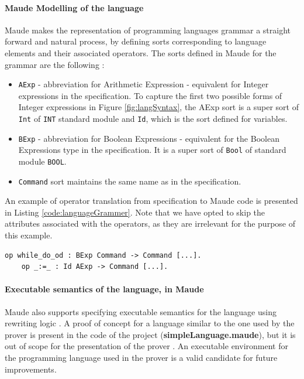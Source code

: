 \documentclass[12pt,a4paper]{article}
\begin{document}
{	\paragraph{Maude Modelling of the language}
	Maude makes the representation of programming languages grammar a straight forward and natural process, by defining sorts corresponding to language elements and their associated operators. The sorts defined in Maude for the grammar are the following : 
	\begin{itemize}
		\item \texttt{AExp} - abbreviation for Arithmetic Expression - equivalent for Integer expressions in the specification. To capture the first two possible forms of Integer expressions in Figure \ref{fig:langSyntax}, the AExp sort is a super sort of \texttt{Int} of \texttt{INT} standard module and \texttt{Id}, which is the sort defined for variables.
		\item \texttt{BExp} - abbreviation for Boolean Expressions - equivalent for the Boolean Expressions type in the specification. It is a super sort of \texttt{Bool} of standard module \texttt{BOOL}. 
		\item \texttt{Command} sort maintains the same name as in the specification.
	\end{itemize}
	An example of operator translation from specification to Maude code is presented in Listing \ref{code:languageGrammer}. Note that we have opted to skip the attributes associated with the operators, as they are irrelevant for the purpose of this example.
	\\
	
	\begin{lstlisting}[label=code:languageGrammer,caption=Example of operator translation to Maude code]
	op while_do_od : BExp Command -> Command [...].
	op _:=_ : Id AExp -> Command [...]. 
	\end{lstlisting}
	
	\paragraph{Executable semantics of the language, in Maude}
	Maude also supports specifying executable semantics for the language using rewriting logic \cite{rewrConcurrency}. A proof of concept for a language similar to the one used by the prover is present in the code of the project (\textbf{simpleLanguage.maude}), but it is out of scope for the presentation of the prover . An executable environment for the programming language used in the prover is a valid candidate for future improvements.

}
\end{document}
